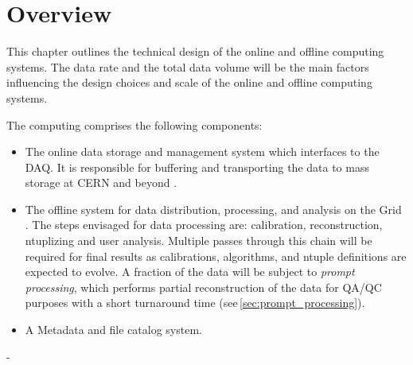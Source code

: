 \section{Overview}



This chapter outlines  the technical design of the online and offline computing systems.
The data rate and the total data volume will be the main factors influencing the design choices and scale of the \pd
online and offline computing systems.   

The \pd computing comprises the following components: 
\begin{itemize}

\item The online data storage and management system which interfaces to the DAQ. It is responsible for buffering
and transporting the data to mass storage at CERN and beyond \cite{comp_model}.

\item The offline system for data distribution, processing, and analysis on the Grid \cite{data_managm_sys}.  
The steps envisaged for data processing are: 
calibration, reconstruction, ntuplizing and user analysis.  Multiple passes through this chain will be required for final results as
calibrations, algorithms, and ntuple definitions are expected to evolve.
A fraction of the data will be subject to \textit{prompt processing}, which performs partial reconstruction of the data for QA/QC purposes
with a short turnaround time (see\,\ref{sec:prompt_processing}).

\item  A Metadata and file catalog system.
\end{itemize}




- 
